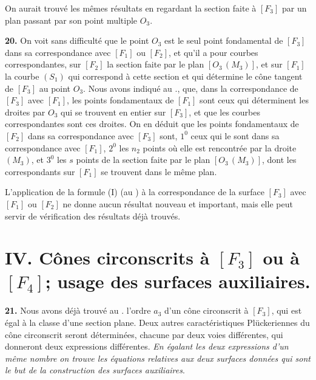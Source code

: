 \documentclass{article}
\begin{document}
On aurait trouvé les mêmes résultats en regardant la section faite à $[F_3]$ par un plan passant par son point multiple $O_3$.

\textbf{20.} On voit sans difficulté que le point $O_3$ est le seul point fondamental de $[F_3]$ dans sa correspondance avec $[F_1]$ ou $[F_2]$, et qu'il a pour courbes correspondantes, sur $[F_2]$ la section faite par le plan $[O_3\,(M_3)]$, et sur $[F_1]$ la courbe $(S_1)$ qui correspond à cette section et qui détermine le cône tangent de $[F_3]$ au point $O_3$. Nous avons indiqué au ., que, dans la correspondance de $[F_3]$ avec $[F_1]$, les points fondamentaux de $[F_1]$ sont ceux qui déterminent les droites par $O_3$ qui se trouvent en entier sur $[F_3]$, et que les courbes correspondantes sont ces droites. On en déduit que les points fondamentaux de $[F_2]$ dans sa correspondance avec $[F_3]$ sont, $1^0$ ceux qui le sont dans sa correspondance avec $[F_1]$, $2^0$ les $n_2$ points où elle est rencontrée par la droite $(M_3)$, et $3^0$ les $s$ points de la section faite par le plan $[O_3\,(M_3)]$, dont les correspondants sur $[F_1]$ se trouvent dans le même plan.

L'application de la formule (I) (au ) à la correspondance de la surface $[F_3]$ avec $[F_1]$ ou $[F_2]$ ne donne aucun résultat nouveau et important, mais elle peut servir de vérification des résultats déjà trouvés.

\section*{IV. Cônes circonscrits à $[F_3]$ ou à $[F_4]$; usage des surfaces auxiliaires.}

\textbf{21.} Nous avons déjà trouvé au . l'ordre $a_3$ d'un cône circonscrit à $[F_3]$, qui est égal à la classe d'une section plane. Deux autres caractéristiques Plückeriennes du cône circonscrit seront déterminées, chacune par deux voies différentes, qui donneront deux expressions différentes. \emph{En égalant les deux expressions d'un même nombre on trouve les équations relatives aux deux surfaces données qui sont le but de la construction des surfaces auxiliaires}.
\end{document}
